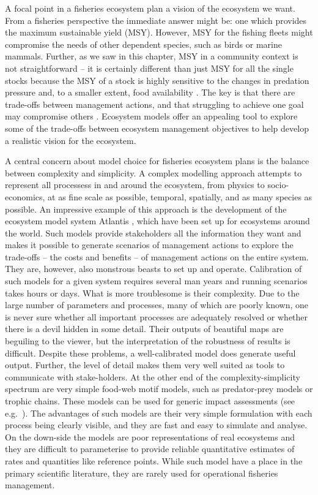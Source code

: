 A focal point in a fisheries ecosystem plan a vision of the ecosystem we want.  From a fisheries perspective the immediate answer might be: one which provides the maximum sustainable yield (MSY).  However, MSY for the fishing fleets might compromise the needs of other dependent species, such as birds or marine mammals.  Further, as we saw in this chapter, MSY in a community context is not straightforward -- it is certainly different than just MSY for all the single stocks because the MSY of a stock is highly sensitive to the changes in predation pressure and, to a smaller extent, food availability \citep{Rindorf2016}.  The key is that there are trade-offs between management actions, and that struggling to achieve one goal may compromise others \citep{Link2010}.  Ecosystem models offer an appealing tool to explore some of the trade-offs between ecosystem management objectives to help develop a realistic vision for the ecosystem.

A central concern about model choice for fisheries ecosystem plans is the balance between complexity and simplicity.  A complex modelling approach attempts to represent all processess in and around the ecosystem, from physics to socio-economics, at as fine scale as possible, temporal, spatially, and as many species as possible.  An impressive example of this approach is the development of the ecosystem model system Atlantis \citep{Fulton2011}, which have been set up for ecosystems around the world.  Such models provide stakeholders all the information they want and makes it possible to generate scenarios of management actions to explore the trade-offs -- the costs and benefits -- of management actions on the entire system.  They are, however, also monstrous beasts to set up and operate.  Calibration of such models for a given system requires several man years and running scenarios takes hours or days.  What is more troublesome is their complexity.  Due to the large number of parameters and processes, many of which are poorly known, one is never sure whether all important processes are adequately resolved or whether there is a devil hidden in some detail.  Their outputs of beautiful maps are beguiling to the viewer, but the interpretation of the robustness of results is difficult.  Despite these problems, a well-calibrated model does generate useful output.   Further, the level of detail makes them very well suited as tools to communicate with stake-holders.  At the other end of the complexity-simplicity spectrum are very simple food-web motif models, such as predator-prey models or trophic chains.  These models can be used for generic impact assessments (see e.g.~\citet{Matsuda2006}).  The advantages of such models are their very simple formulation with each process being clearly visible, and they are fast and easy to simulate and analyse.  On the down-side the models are poor representations of real ecosystems and they are difficult to parameterise to provide reliable quantitative estimates of rates and quantities like reference points.  While such model have a place in the primary scientific literature, they are rarely used for operational fisheries management.  

